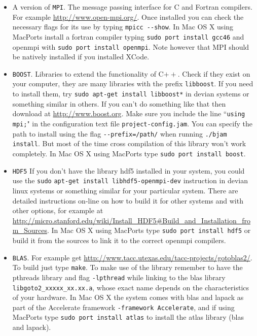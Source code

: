 \begin{itemize}
\item A version of \verb!MPI!.
The message passing interface for C and Fortran compilers. For example \url{http://www.open-mpi.org/}.
Once installed you can check the necessary flags for its use by typing
\verb!mpicc --show!.
In Mac OS X using MacPorts install a fortran compiler typing
\verb!sudo port install gcc46! and openmpi with \verb!sudo port install openmpi!. Note however that MPI should be natively installed if you installed XCode.

\item \verb!BOOST!.
Libraries to extend the functionality of C$++$. Check if they exist on your computer, they are many
libraries with the prefix \verb!libboost!.
If you need to install them, try \verb!sudo apt-get install libboost*! in devian systems or
something similar in others.
If you can't do something like that then download at \url{http://www.boost.org}.
Make sure you include the line ``\verb!using mpi;!" in the configuration text file \verb!project-config.jam!.
You can specify the path to install using the flag \verb!--prefix=/path/! when running \verb!./bjam!
\verb!install!. But most of the time cross compilation of this library won't work completely.
In Mac OS X using MacPorts type \verb!sudo port install boost!.

\item \verb!HDF5!
If you don't have the library hdf5 installed in your system, you could use the
\verb!sudo! \verb!apt-get install libhdf5-openmpi-dev! instruction in devian linux systems or something similar
for your particular system. There are detailed instructions on-line on how to build it for other systems and
with other options, for example at \url{http://micro.stanford.edu/wiki/Install_HDF5#Build_and_Installation_from_Sources}.
In Mac OS X using MacPorts type \verb!sudo port install hdf5! or build it from the sources to link it to the correct
openmpi compilers.

\item \verb!BLAS!.
For example get \url{http://www.tacc.utexas.edu/tacc-projects/gotoblas2/}. To build just type \verb!make!.
To make use of the library remember to
have the pthreads library and flag  \verb!-lpthread! while linking to the blas library  \verb!libgoto2_xxxxx_xx.xx.a!,
whose exact name depends on the characteristics of your hardware. In Mac OS X
the system comes with blas and lapack as part of the Accelerate framework \verb!-framework Accelerate!,
and if using MacPorts type
\verb!sudo port install atlas! to install the atlas library (blas and lapack).


\end{itemize}
